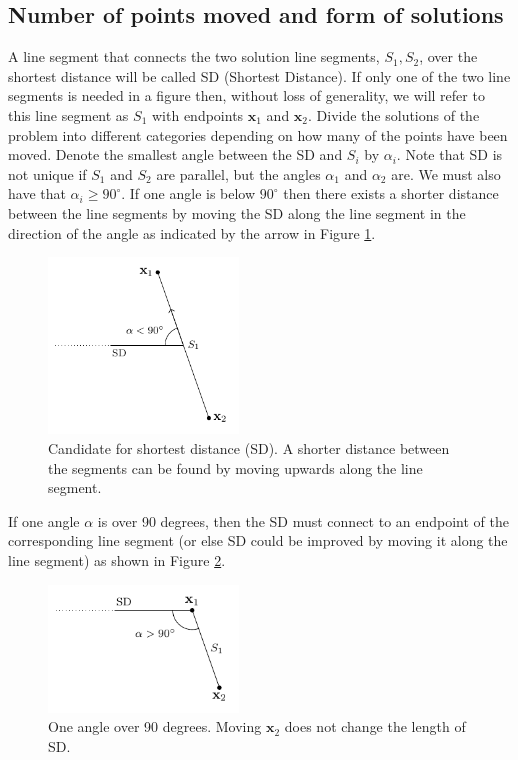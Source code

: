 \subsection[Number of points moved]{Number of points moved and form of solutions}
%
A line segment that connects the two solution line segments, $S_1, S_2$, over the 
shortest distance will be called SD (Shortest Distance). If only one of the two line 
segments is needed in a figure then, without loss of generality, we will refer to this
line segment as $S_1$ with endpoints $\textbf{x}_1$ and $\textbf{x}_2$. Divide the solutions of the
problem into different categories depending on how many of the points have been moved. 
Denote the smallest angle between the SD and $S_i$ by $\alpha_i$. Note that SD is not
unique if $S_1$ and $S_2$ are parallel, but the angles $\alpha_1$ and $\alpha_2$ are.
We must also have that $\alpha_i \geq 90^\circ$. If one angle is below $90^\circ$ then there 
exists a shorter distance between the line segments by moving the SD along 
the line segment in the direction of the angle as indicated by the arrow
in Figure \ref{fig:four_point_all_alpha}. 
%
\begin{figure}[H]
	\centering
	\includegraphics[width=0.45\textwidth]{figures/constraint_handling/interwell_angles.pdf}
	\caption{Candidate for shortest distance (SD). A shorter distance between the segments
			 can be found by moving upwards along the line segment.}
	\label{fig:four_point_all_alpha}
\end{figure}
%
%
If one angle $\alpha$ is over 90 degrees, then the SD must connect to an endpoint
of the corresponding line segment (or else SD could be improved by moving it along the line
segment) as shown in Figure \ref{fig:four_point_angles_4p}. 
%
\begin{figure}[H]
	\centering
	\includegraphics[width=0.45\textwidth]{figures/constraint_handling/interwell_angles_4p.pdf}
	\caption{One angle over 90 degrees. Moving $\textbf{x}_2$ does not change the length of SD.}
	\label{fig:four_point_angles_4p}
\end{figure}
